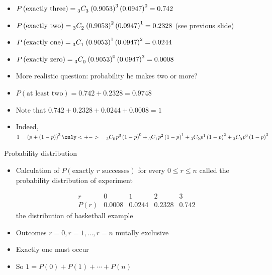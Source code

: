 \documentclass[xcolor=dvipsnames]{beamer}
\theoremstyle{definition}
\newcommand\ncr[2]{\tensor[_{#1}]C{_{#2}}}
\begin{document}
\begin{frame}
\begin{itemize}
\item $P\left(\text{exactly three}\right)
=\ncr{3}{3}\left(0.9053\right)^3\left(0.0947\right)^0=0.742$
\item $P\left(\text{exactly two}\right)
=\ncr{3}{2}\left(0.9053\right)^2\left(0.0947\right)^1=0.2328$
(see previous slide)
\item $P\left(\text{exactly one}\right)
=\ncr{3}{1}\left(0.9053\right)^1\left(0.0947\right)^2=0.0244$
\item $P\left(\text{exactly zero}\right)
=\ncr{3}{0}\left(0.9053\right)^0\left(0.0947\right)^3=0.0008$
\item More realistic question: probability he makes two or more?
\item $P\left(\text{at least two}\right)=0.742+0.2328=0.9748$
\item Note that $0.742+0.2328+0.0244+0.0008=1$
\item Indeed, $1=\left(p+\left(1-p\right)\right)^3
\only<+->{=\ncr{3}{0}p^3\left(1-p\right)^0
+\ncr{3}{1}p^2\left(1-p\right)^1
+\ncr{3}{2}p^1\left(1-p\right)^2
+\ncr{3}{0}p^0\left(1-p\right)^3}$
\end{itemize}
\end{frame}

\begin{frame}{Probability distribution}
\begin{itemize}
\item Calculation of $P\left(\text{exactly $r$ successes}\right)$
for every $0\le r\le n$ called the \alert{probability distribution}
of experiment
\begin{example}
\[\begin{array}{r|rrrr}
r&0&1&2&3\\\hline
P\left(r\right)
&0.0008&0.0244&0.2328&0.742
\end{array}\]
the distribution of basketball example
\end{example}
\item Outcomes $r=0,r=1,\ldots,r=n$
mutally exclusive
\item Exactly one must occur
\item So $1=
P\left(0\right)+P\left(1\right)+\cdots+P\left(n\right)$
\end{itemize}
\end{frame}
\end{document}
